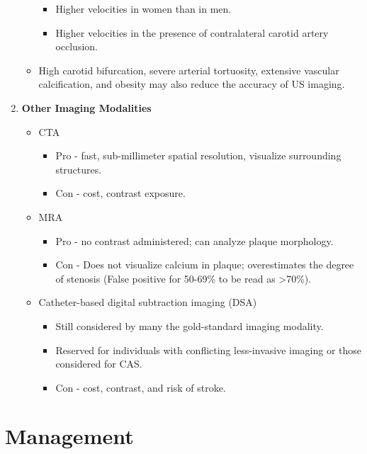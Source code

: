 \documentclass[
]{book}
\begin{document}
\begin{enumerate}
\begin{itemize}
    \begin{itemize}
    \item
      Higher velocities in women than in men.
    \item
      Higher velocities in the presence of contralateral carotid
      artery occlusion.
    \end{itemize}
  \item
    High carotid bifurcation, severe arterial tortuosity, extensive
    vascular calcification, and obesity may also reduce the accuracy
    of US imaging.
  \end{itemize}
\item
  \textbf{Other Imaging Modalities}

  \begin{itemize}
  \item
    CTA

    \begin{itemize}
    \item
      Pro - fast, sub-millimeter spatial resolution, visualize
      surrounding structures.
    \item
      Con - cost, contrast exposure.
    \end{itemize}
  \item
    MRA

    \begin{itemize}
    \item
      Pro - no contrast administered; can analyze plaque
      morphology.
    \item
      Con - Does not visualize calcium in plaque; overestimates
      the degree of stenosis (False positive for 50-69\% to be read
      as \textgreater70\%).
    \end{itemize}
  \item
    Catheter-based digital subtraction imaging (DSA)

    \begin{itemize}
    \item
      Still considered by many the gold-standard imaging modality.
    \item
      Reserved for individuals with conflicting less-invasive
      imaging or those considered for CAS.
    \item
      Con - cost, contrast, and risk of stroke.
    \end{itemize}
  \end{itemize}
\end{enumerate}

\hypertarget{management}{%
\section{Management}\label{management}}
\end{document}
